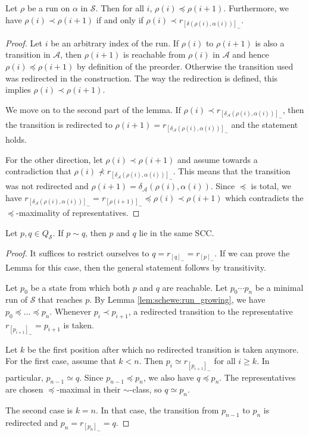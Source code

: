 \begin{lem}
\label{lem:schewe:run_growing}
	Let $\rho$ be a run on $\alpha$ in $\mathcal{S}$. Then for all $i$, $\rho(i) \preceq \rho(i+1)$.
	Furthermore, we have $\rho(i) \prec \rho(i+1)$ if and only if $\rho(i) \prec r_{[\delta(\rho(i), \alpha(i))]_\sim}$.
\end{lem}

\begin{proof}
	Let $i$ be an arbitrary index of the run. If $\rho(i)$ to $\rho(i+1)$ is also a transition in $\mathcal{A}$, then $\rho(i+1)$ is reachable from $\rho(i)$ in $\mathcal{A}$ and hence $\rho(i) \preceq \rho(i+1)$ by definition of the preorder. Otherwise the transition used was redirected in the construction. The way the redirection is defined, this implies $\rho(i) \prec \rho(i+1)$.
	
	We move on to the second part of the lemma. If $\rho(i) \prec r_{[\delta_\mathcal{A}(\rho(i), \alpha(i))]_\sim}$, then the transition is redirected to $\rho(i+1) = r_{[\delta_\mathcal{A}(\rho(i), \alpha(i))]_\sim}$ and the statement holds. 
	
	For the other direction, let $\rho(i) \prec \rho(i+1)$ and assume towards a contradiction that $\rho(i) \not\prec r_{[\delta_\mathcal{A}(\rho(i), \alpha(i))]_\sim}$. This means that the transition was not redirected and $\rho(i+1) = \delta_\mathcal{A}(\rho(i), \alpha(i))$. Since $\preceq$ is total, we have $r_{[\delta_\mathcal{A}(\rho(i), \alpha(i))]_\sim} = r_{[\rho(i+1)]_\sim} \preceq \rho(i) \prec \rho(i+1)$ which contradicts the $\preceq$-maximality of representatives.
\end{proof}

\begin{lem}
\label{lem:schewe:equiv_same_scc}
	Let $p, q \in Q_\mathcal{S}$. If $p \sim q$, then $p$ and $q$ lie in the same SCC. 
\end{lem}

\begin{proof}
	It suffices to restrict ourselves to $q = r_{[q]_\sim} = r_{[p]_\sim}$. If we can prove the Lemma for this case, then the general statement follows by transitivity.
	
	Let $p_0$ be a state from which both $p$ and $q$ are reachable. Let $p_0 \cdots p_n$ be a minimal run of $\mathcal{S}$ that reaches $p$. By Lemma \ref{lem:schewe:run_growing}, we have $p_0 \preceq \dots \preceq p_n$. Whenever $p_i \prec p_{i+1}$, a redirected transition to the representative $r_{[p_{i+1}]_\sim} = p_{i+1}$ is taken. 
	
	Let $k$ be the first position after which no redirected transition is taken anymore. For the first case, assume that $k < n$. Then $p_i \simeq r_{[p_{i+1}]_\sim}$ for all $i \geq k$. In particular, $p_{n-1} \simeq q$. Since $p_{n-1} \preceq p_n$, we also have $q \preceq p_n$. The representatives are chosen $\preceq$-maximal in their $\sim$-class, so $q \simeq p_n$.
	
	The second case is $k = n$. In that case, the transition from $p_{n-1}$ to $p_n$ is redirected and $p_n = r_{[p_n]_\sim} = q$.
\end{proof}


